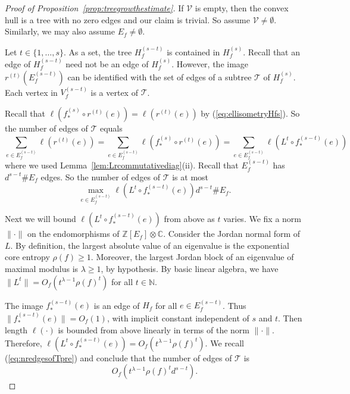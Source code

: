 \documentclass[12pt,oneside,a4]{amsart}
\newcommand{\IC}{\mathbb{C}}
\newcommand{\IN}{\mathbb{N}}
\newcommand{\IZ}{\mathbb{Z}}
\newcommand{\cV}{\mathcal{V}}
\newcommand{\cT}{\mathcal{T}}
\numberwithin{maincounter}{section}
\numberwithin{equation}{section}
\begin{document}
\begin{proof}[Proof of Proposition~\ref{prop:treegrowthestimate}]
  If $\cV$ is empty, then the convex hull is a tree with no zero edges
  and our claim is
  trivial. So assume $\cV\not=\emptyset$.
  Similarly, we may also assume $E_f\not=\emptyset$. 

  Let $t\in \{1,\ldots,s\}$. As a
  set, the tree $H_f^{(s-t)}$ is contained in $H_f^{(s)}$. Recall that
  an edge of $H_f^{(s-t)}$ need not be an edge of $H_f^{(s)}$.
  However, the image $r^{(t)}(E_f^{(s-t)})$ can be identified with the
  set of edges of a subtree $\cT$ of $H_f^{(s)}$.
  Each vertex in $V_f^{(s-t)}$ is a vertex of $\cT$. 

  
  Recall that
  $\ell(f_*^{(s)}\circ r^{(t)}(e)) = \ell(r^{(t)}(e))$ by
  (\ref{eq:ellisometryHfs}). So the
  number of edges of $\cT$ equals
  \begin{equation*}
    \sum_{e\in E_f^{(s-t)}} \ell(r^{(t)}(e)) = \sum_{e\in E_f^{(s-t)}}
    \ell(f_*^{(s)}\circ r^{(t)}(e))
    =\sum_{e\in E_f^{(s-t)}}
    \ell(L^{t}\circ f_*^{(s-t)}(e))
  \end{equation*}
  where we used Lemma~\ref{lem:Lrcommutativediag}(ii).
  Recall 
  that $E_f^{(s-t)}$ has $d^{s-t} \#E_f$ edges. So the number of edges
  of $\cT$ is at most
  \begin{equation}
    \label{eq:nredgesofTpre}
    \max_{e\in E_f^{(s-t)}}\ell(L^{t}\circ f_*^{(s-t)}(e))d^{s-t} \#E_f.
  \end{equation}
  

  Next we will bound $\ell(L^{t}\circ f_*^{(s-t)}(e))$ from above as $t$ varies.
  We fix  a norm $\|\cdot\|$ on the
  endomorphisms of $\IZ[E_f]\otimes\IC$. 
  Consider the Jordan normal form of $L$. By definition, the largest
  absolute value of an eigenvalue is the exponential core entropy
  $\rho(f)\ge 1$. Moreover, 
  the largest Jordan block of an eigenvalue of maximal modulus is
  $\lambda \ge 1$, by hypothesis. 
  By basic linear algebra, we have 
  $\| L^t\| = O_f(t^{\lambda-1}\rho(f)^t)$ for all  $t\in\IN$.
  
  The image  $f_*^{(s-t)}(e)$ is an edge of $H_f$ for all $e\in
  E_f^{(s-t)}$.  Thus $\| f_*^{(s-t)}(e)\| = O_f(1)$, with implicit
  constant independent of $s$ and $t$.
  Then length $\ell(\cdot)$ is bounded from above linearly in terms of
  the norm $\|\cdot\|$. 
  Therefore, $\ell(L^{t}\circ f_*^{(s-t)}(e)) = O_f(t^{\lambda-1}\rho(f)^t)$.
  We recall (\ref{eq:nredgesofTpre}) and
  conclude that the number of edges of  $\cT$ is
  \begin{equation}
    \label{eq:nredgesofT}
    O_f( t^{\lambda-1} \rho(f)^{t} d^{s-t}). 
  \end{equation}


\end{proof}
\end{document}
